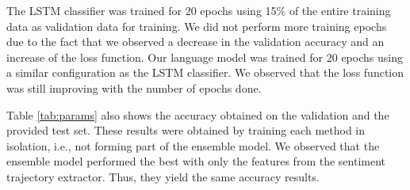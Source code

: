 \documentclass{article}
\newcommand{\lstm}{LSTM }
\begin{document}
\begin{table}[h!]
    \begin{center}
    \end{center}
\caption{Feature extractors.}
\label{tab:params}
\end{table}
\vspace*{-0.5cm}

The \lstm classifier was trained for 20 epochs using 15\% of the entire training
data as validation data for training. We did not perform more training epochs
due to the fact that we observed a decrease in the validation accuracy and an
increase of the loss function.  Our language model was trained for 20 epochs
using a similar configuration as the \lstm classifier. We observed that the loss
function was still improving with the number of epochs done.


Table \ref{tab:params} also shows the accuracy obtained on
the validation and the provided test set. These results were obtained by
training each method in isolation, i.e., not forming part of the ensemble model.
We observed that the ensemble model performed the best with only the features
from the sentiment trajectory extractor. Thus, they
yield the same accuracy results.
\end{document}
